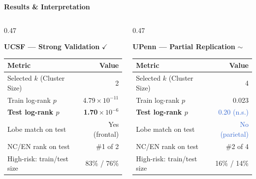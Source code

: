 \documentclass[aspectratio=169, 10pt]{beamer}
\begin{document}
\begin{frame}{\textbf{Results \& Interpretation}}
\footnotesize

\begin{columns}[T]
\begin{column}{0.47\textwidth}

\textbf{UCSF — Strong Validation} \textcolor{GoodGreen}{\textbf{$\checkmark$}}

\vspace{0.08cm}
{\small
\begin{tabular}{@{}l r@{}}
\toprule
\textbf{Metric} & \textbf{Value} \\
\midrule
Selected $k$ (Cluster Size)       & 2 \\
Train log-rank $p$                & 4.79\,$\times$\,$10^{-11}$ \\
\textbf{Test log-rank $p$}        & \textcolor{GoodGreen}{\textbf{1.70\,$\times$\,$10^{-6}$}} \\
Lobe match on test                & \textcolor{GoodGreen}{Yes (frontal)} \\
NC/EN rank on test                & \textcolor{GoodGreen}{\#1 of 2} \\
High-risk: train/test size        & 83\% / 76\%  \\
\bottomrule
\end{tabular}
}

\end{column}
\begin{column}{0.47\textwidth}

\textbf{UPenn — Partial Replication} \textcolor{WarnOrange}{\textbf{$\sim$}}

\vspace{0.08cm}
{\small
\begin{tabular}{@{}l r@{}}
\toprule
\textbf{Metric} & \textbf{Value} \\
\midrule
Selected $k$ (Cluster Size)        & 4 \\
Train log-rank $p$                 & 0.023 \\
\textbf{Test log-rank $p$}         & \textcolor{Highlight}{0.20 (n.s.)} \\
Lobe match on test                 & \textcolor{Highlight}{No (parietal)} \\
NC/EN rank on test                 & \#2 of 4 \\
High-risk: train/test size         & 16\% / 14\% \\
\bottomrule
\end{tabular}
}


\end{column}
\end{columns}
\end{frame}
\end{document}
